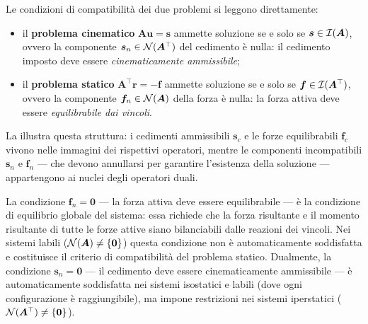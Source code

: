Le condizioni di compatibilità dei due problemi si leggono direttamente:
\begin{itemize}[nosep]
	\item il \textbf{problema cinematico} $\bm{A}\bm{u} = \bm{s}$ ammette soluzione
	se e solo se $\bm{s} \in \mathcal{I}(\bm{A})$, ovvero la componente
	$\bm{s}_n \in \mathcal{N}(\bm{A}^\top)$ del cedimento è nulla: il cedimento
	imposto deve essere \emph{cinematicamente ammissibile};
	\item il \textbf{problema statico} $\bm{A}^\top\bm{r} = -\bm{f}$ ammette
	soluzione se e solo se $\bm{f} \in \mathcal{I}(\bm{A}^\top)$, ovvero la
	componente $\bm{f}_n \in \mathcal{N}(\bm{A})$ della forza è nulla: la forza
	attiva deve essere \emph{equilibrabile dai vincoli}.
\end{itemize}

La  illustra questa struttura: i cedimenti
ammissibili $\bm{s}_c$ e le forze equilibrabili $\bm{f}_c$ vivono nelle immagini
dei rispettivi operatori, mentre le componenti incompatibili $\bm{s}_n$ e
$\bm{f}_n$ --- che devono annullarsi per garantire l'esistenza della soluzione
--- appartengono ai nuclei degli operatori duali.

\begin{oss}
	La condizione $\bm{f}_n = \bm{0}$ --- la forza attiva deve essere
	equilibrabile --- è la condizione di equilibrio globale del sistema:
	essa richiede che la forza risultante e il momento risultante di tutte
	le forze attive siano bilanciabili dalle reazioni dei vincoli. Nei
	sistemi labili ($\mathcal{N}(\bm{A}) \neq \{\bm{0}\}$) questa condizione non è
	automaticamente soddisfatta e costituisce il criterio di compatibilità
	del problema statico. Dualmente, la condizione $\bm{s}_n = \bm{0}$ ---
	il cedimento deve essere cinematicamente ammissibile --- è automaticamente
	soddisfatta nei sistemi isostatici e labili (dove ogni configurazione è
	raggiungibile), ma impone restrizioni nei sistemi iperstatici
	($\mathcal{N}(\bm{A}^\top) \neq \{\bm{0}\}$).
\end{oss}

